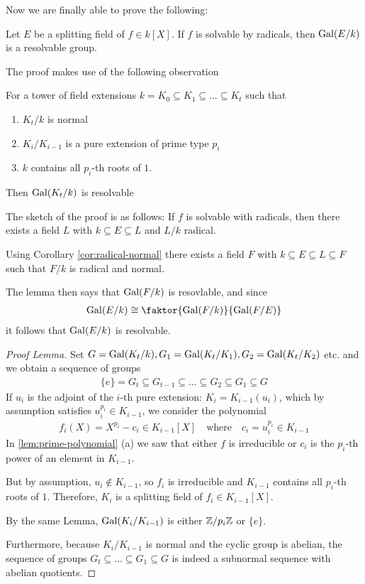 
Now we are finally able to prove the following:
\begin{thm}[]
  Let $E$ be a splitting field of $f \in k[X]$.
  If $f$ is solvable by radicals, then $\operatorname{Gal}(E/k)$ is a resolvable group.
\end{thm}
The proof makes use of the following observation
\begin{lem}[]
  For a tower of field extensions
  $
    k = K_0 \subseteq K_1 \subseteq \ldots \subseteq K_t
  $
  such that
  \begin{enumerate}
    \item $K_t/k$ is normal
    \item $K_i/K_{i-1}$ is a pure extension of prime type $p_i$
    \item $k$ contains all $p_i$-th roots of $1$.
  \end{enumerate}
  Then $\operatorname{Gal}(K_t/k)$ is resolvable
\end{lem}
The sketch of the proof is as follows: If $f$ is solvable with radicals, then there exists a field $L$ with $k \subseteq E \subseteq L$ and $L/k$ radical.

Using Corollary \ref{cor:radical-normal} there exists a field $F$ with $k \subseteq E \subseteq L \subseteq F$ such that $F/k$ is radical and normal.

The lemma then says that $\operatorname{Gal}(F/k)$ is resovlable, and since
\begin{align*}
  \Gal(E/k) \iso \faktor{\Gal(F/k)}{\Gal(F/E)}
\end{align*}
it follows that $\operatorname{Gal}(E/k)$ is resolvable.

\begin{proof}[Proof Lemma]
  Set $G = \operatorname{Gal}(K_t/k), G_1 = \operatorname{Gal}(K_t/K_1), G_2 = \operatorname{Gal}(K_t/K_2)$ etc. and we obtain a sequence of groups
  \begin{align*}
    \{e\} = G_t \subseteq G_{t-1} \subseteq \ldots \subseteq G_2 \subseteq G_1 \subseteq G
  \end{align*}
  If $u_i$ is the adjoint of the $i$-th pure extension: $K_i = K_{i-1}(u_i)$, which by assumption satisfies $u_i^{p_i} \in K_{i-1}$, we consider the polynomial
  \begin{align*}
    f_i(X) = X^{p_i} - c_i \in K_{i-1}[X] \quad \text{where} \quad c_i = u_i^{p_i} \in K_{i-1}
  \end{align*}
  In \ref{lem:prime-polynomial} (a) we saw that either $f$ is irreducible or $c_i$ is the $p_i$-th power of an element in $K_{i-1}$.

  But by assumption, $u_i \notin K_{i-1}$, so $f_i$ is irreducible and $K_{i-1}$ contains all $p_i$-th roots of $1$. Therefore, $K_i$ is a splitting field of $f_i \in K_{i-1}[X]$. 

  By the same Lemma, $\operatorname{Gal}(K_i/K_{i-1})$ is either $\mathbb{Z}/p_i\mathbb{Z}$ or $\{e\}$.

  Furthermore, because $K_i/K_{i-1}$ is normal and the cyclic group is abelian,
the sequence of groups $G_t \subseteq \ldots \subseteq G_1 \subseteq G$ is indeed a subnormal sequence with abelian quotients.
\end{proof}

